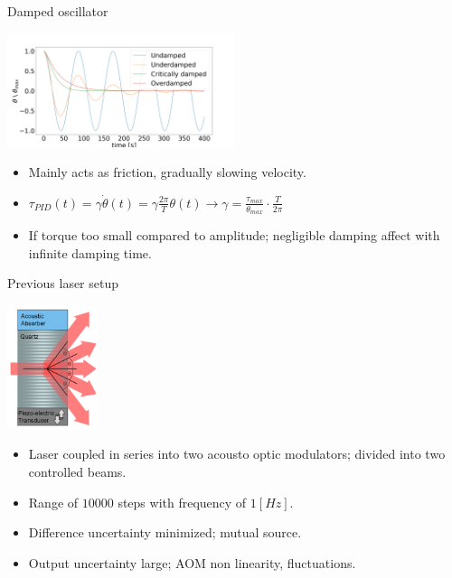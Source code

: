 \documentclass{beamer}
\begin{document}
\begin{frame}{Damped oscillator}
	\begin{center}		
		\includegraphics[width=0.5\textwidth,keepaspectratio]{damp.png}
	\end{center}
	\begin{itemize}		
		
		\item Mainly acts as friction, gradually slowing velocity.
		\item $\tau_{PID}(t) =  \gamma\dot{\theta}(t) =  \gamma\frac{2\pi}{T} \theta( t) \rightarrow \gamma  =\frac{\tau_{max}}{\theta_{max}}\cdot \frac{ T}{2\pi} $
		\item If torque too small compared to amplitude; negligible damping affect with infinite damping time. 
		
	\end{itemize}
\end{frame}


\begin{frame}{Previous laser setup}
	\begin{center}		
		\includegraphics[width=0.2\textwidth,keepaspectratio]{aom.png}
	\end{center}
	\begin{itemize}		
		\item Laser coupled in series into two acousto optic modulators; divided into two controlled beams.
		\item Range of $10000$ steps with frequency of $1 [Hz]$.
		\item Difference uncertainty minimized; mutual source.
		\item Output uncertainty large; AOM non linearity, fluctuations.
	\end{itemize}
\end{frame}
\end{document}
